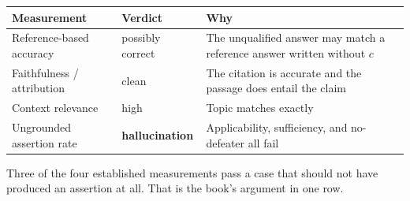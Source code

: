 \begin{center}
\small
\begin{tabular}{@{}>{\raggedright\arraybackslash}p{4.3cm}>{\raggedright\arraybackslash}p{2.5cm}>{\raggedright\arraybackslash}p{6.2cm}@{}}
\toprule
Measurement & Verdict & Why \\
\midrule
Reference-based accuracy
  & possibly correct
  & The unqualified answer may match a reference answer written without $c$ \\
\addlinespace
Faithfulness / attribution
  & clean
  & The citation is accurate and the passage does entail the claim \\
\addlinespace
Context relevance
  & high
  & Topic matches exactly \\
\addlinespace
Ungrounded assertion rate
  & \textbf{hallucination}
  & Applicability, sufficiency, and no-defeater all fail \\
\bottomrule
\end{tabular}
\end{center}

Three of the four established measurements pass a case that should not have produced an
assertion at all. That is the book's argument in one row.
